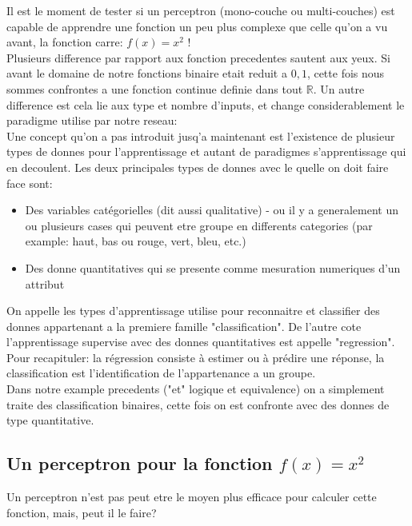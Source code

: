 \documentclass[twoside,openright,a4paper,11pt,french]{article}
\begin{document}
Il est le moment de tester si un perceptron (mono-couche ou multi-couches) est
capable de apprendre une fonction un peu plus complexe que celle qu'on a vu avant, 
la fonction carre: $f(x) = x^2$ !\\

Plusieurs difference par rapport aux fonction precedentes sautent aux yeux.
Si avant le domaine de notre fonctions binaire etait reduit a ${0,1}$, cette
fois nous sommes confrontes a une fonction continue definie dans tout $\mathbb{R}$.
Un autre difference est cela lie aux type et nombre d'inputs, et change
considerablement le paradigme utilise par notre reseau:\\

Une concept qu'on a pas introduit jusq'a maintenant est l'existence de plusieur
types de donnes pour l'apprentissage et autant de paradigmes s'apprentissage qui en
decoulent. Les deux principales types de donnes avec le quelle on doit faire
face sont:

\begin{itemize}
\item Des variables catégorielles (dit aussi qualitative) - ou il y a generalement
      un ou plusieurs cases qui peuvent etre groupe en differents categories 
     (par example: haut, bas ou rouge, vert, bleu, etc.)
\item Des donne quantitatives qui se presente comme mesuration numeriques d'un attribut
\end{itemize}

On appelle les types d'apprentissage utilise pour reconnaitre et classifier des donnes
appartenant a la premiere famille "classification". De l'autre cote l'apprentissage
supervise avec des donnes quantitatives est appelle "regression".\cite{kindsNN}\\

Pour recapituler: la régression consiste à estimer ou à prédire une réponse,
la classification est l'identification de l'appartenance a un groupe.\\

Dans notre example precedents ("et" logique et equivalence) on a simplement
traite des classification binaires, cette fois on est confronte avec des donnes
de type quantitative.


\subsection{Un perceptron pour la fonction $f(x) = x^2$}
Un perceptron n'est pas peut etre le moyen plus efficace pour calculer cette 
fonction, mais, peut il le faire?\\
\end{document}
